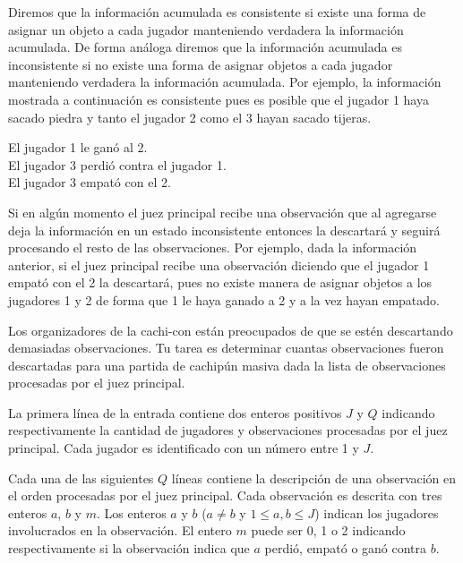 \documentclass{oci}
\begin{document}
\begin{problemDescription}
  Diremos que la información acumulada es consistente si existe una forma de
  asignar un objeto a cada jugador manteniendo verdadera la información
  acumulada.
  De forma análoga diremos que la información acumulada es inconsistente si no
  existe una forma de asignar objetos a cada jugador manteniendo verdadera la
  información acumulada.
  Por ejemplo, la información mostrada a continuación es consistente pues es
  posible que el jugador 1 haya sacado piedra y tanto el jugador 2 como
  el 3 hayan sacado tijeras.

    \begin{center}
      El jugador 1 le ganó al 2.\\
      El jugador 3 perdió contra el jugador 1.\\
      El jugador 3 empató con el 2.
    \end{center}

  Si en algún momento el juez principal recibe una observación que al agregarse
  deja la información en un estado inconsistente entonces la descartará y
  seguirá procesando el resto de las observaciones.
  Por ejemplo, dada la información anterior, si el juez principal recibe una
  observación diciendo que el jugador 1 empató con el 2 la descartará, pues
  no existe manera de asignar objetos a los jugadores 1 y 2 de forma que 1 le
  haya ganado a 2 y a la vez hayan empatado.

  Los organizadores de la cachi-con están preocupados de que se estén
  descartando demasiadas observaciones.
  Tu tarea es determinar cuantas observaciones fueron descartadas para una
  partida de cachipún masiva dada la lista de observaciones procesadas por el
  juez principal.
\end{problemDescription}

\begin{inputDescription}
  La primera línea de la entrada contiene dos enteros positivos $J$ y $Q$
  indicando respectivamente la cantidad de jugadores y observaciones procesadas
  por el juez principal.
  Cada jugador es identificado con un número entre 1 y $J$.

  Cada una de las siguientes $Q$ líneas contiene la descripción
  de una observación en el orden procesadas por el juez principal.
  Cada observación es descrita con tres enteros $a$, $b$ y $m$.
  Los enteros $a$ y $b$ ($a\neq b$ y $1\leq a, b \leq J$) indican los jugadores
  involucrados en la observación. 
  El entero $m$ puede ser 0, 1 o 2 indicando respectivamente si la observación indica
  que $a$ perdió, empató o ganó contra $b$.
\end{inputDescription}
\end{document}

